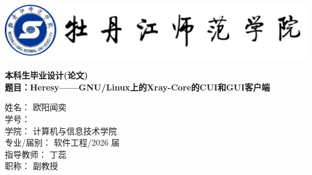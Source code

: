 \documentclass[12pt,a4paper]{article}%
\begin{document}
\pagestyle{fancy}%
\fancyhf{} %
\thispagestyle{empty}%
\begin{center}
	\includegraphics[width=15cm]{img/logo.png} %
	\vspace{0.5cm}

	\Huge \textbf{本科生毕业设计(论文)}\\[2cm]

	\LARGE \textbf{题目：Heresy——GNU/Linux上的Xray-Core的CUI和GUI客户端}\\[3cm]
\end{center}

\begin{flushleft}
	\large
	\begin{tabbing}
		姓\hspace{1.5em}名：\hspace{1.5em} \= 欧阳闻奕  \\[0.5cm]
		学\hspace{1.5em}号： \\[0.5cm]
		学\hspace{1.5em}院：\> 计算机与信息技术学院 \\[0.5cm]
		专业/届别：\> 软件工程/2026 届 \\[0.5cm]
		指导教师：\> 丁蕊 \\[0.5cm]
		职\hspace{1.5em}称：\> 副教授 \\[0.5cm]
	\end{tabbing}
\end{flushleft}
\end{document}
